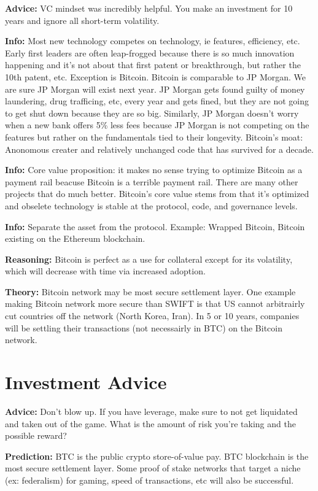 \documentclass[10pt,twocolumn]{article}
\begin{document}
{\bf Advice:} VC mindset was incredibly helpful. You make an investment for 10
years and ignore all short-term volatility. 

{\bf Info:} Most new technology competes on technology, ie features, efficiency,
etc. Early first leaders are often leap-frogged because there is so much
innovation happening and it's not about that first patent or breakthrough, but
rather the 10th patent, etc. Exception is Bitcoin. Bitcoin is comparable to JP
Morgan. We are sure JP Morgan will exist next year. JP Morgan gets found guilty
of money laundering, drug trafficing, etc, every year and gets fined, but they
are not going to get shut down because they are so big. Similarly, JP Morgan
doesn't worry when a new bank offers 5\% less fees because JP Morgan is not
competing on the features but rather on the fundamentals tied to their
longevity. Bitcoin's moat: Anonomous creater and relatively unchanged code that
has survived for a decade. 

{\bf Info:} Core value proposition: it makes no sense trying to optimize Bitcoin
as a payment rail beacuse Bitcoin is a terrible payment rail. There are many
other projects that do much better. Bitcoin's core value stems from that it's
optimized and obselete technology is stable at the protocol, code, and
governance levels. 

{\bf Info:} Separate the asset from the protocol. Example: Wrapped Bitcoin,
Bitcoin existing on the Ethereum blockchain. 

{\bf Reasoning:} Bitcoin is perfect as a use for collateral except for its
volatility, which will decrease with time via increased adoption. 

{\bf Theory:} Bitcoin network may be most secure settlement layer. One example
making Bitcoin network more secure than SWIFT is that US cannot arbitrairly cut
countries off the network (North Korea, Iran). In 5 or 10 years, companies will
be settling their transactions (not necessairly in BTC) on the Bitcoin network. 

\section{Investment Advice} %

{\bf Advice:} Don't blow up. If you have leverage, make sure to not get
liquidated and taken out of the game. What is the amount of risk you're taking
and the possible reward?

{\bf Prediction:} BTC is the public crypto store-of-value pay. BTC blockchain is
the most secure settlement layer. Some proof of stake networks that target a
niche (ex: federalism) for gaming, speed of transactions, etc will also be
successful. 
\end{document}
